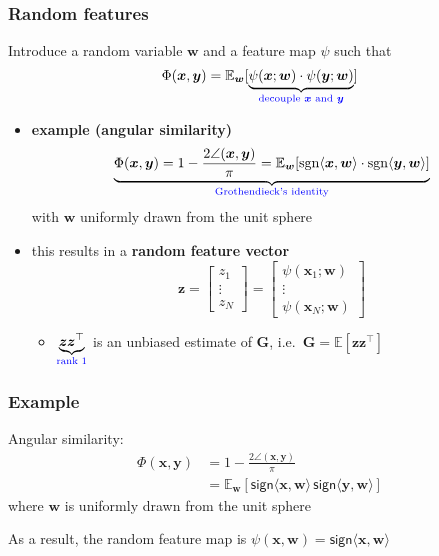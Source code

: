 \documentclass[compress,
mathserif,wide,%
]{beamer}
\begin{document}
\begin{frame}
\frametitle{Random features}  

	Introduce a random variable $\bm{w}$ and a feature map $\psi$ such that
	\[
		\Phi(\bm{x},\bm{y})=\mathbb{E}_{\bm{w}}[ \underset{\textcolor{blue}{ \text{decouple }\bm{x}\text{ and }\bm{y}}}{\underbrace{ \psi(\bm{x};\bm{w})\cdot\psi(\bm{y};\bm{w}) }} ]
	\]
	\begin{itemize}
		\item<1> {\bf example (angular similarity)}
		\begin{align}
			\label{eq:angular-similarity-random}
			\underset{\textcolor{blue}{ \text{Grothendieck's identity}}}{\underbrace{ \Phi(\bm{x},\bm{y})=1-\frac{2\angle(\bm{x},\bm{y})}{\pi}=\mathbb{E}_{\bm{w}}[\mathrm{sgn}\langle\bm{x},\bm{w}\rangle \cdot \mathrm{sgn}\langle\bm{y},\bm{w}\rangle] }}
		\end{align}
		with $\bm{w}$ uniformly drawn from the unit sphere


		\vspace{-7em}
		\item<2> this results in a {\bf random feature vector}
		\[
			\bm{z}=\left[\begin{array}{c}
				z_{1}\\
				\vdots\\
				z_{N}
			\end{array}\right]
			=\left[\begin{array}{c}
				\psi(\bm{x}_{1};\bm{w})\\
				\vdots\\
				\psi(\bm{x}_{N};\bm{w})
			\end{array}\right]
		\]
		\begin{itemize}
			\item $\underset{\textcolor{blue}{ \text{rank 1}}}{\underbrace{\bm{z}\bm{z}^{\top}}}$ is an \alert{unbiased estimate} of $\bm{G}$, i.e.~$\bm{G}=\mathbb{E}[\bm{z}\bm{z}^{\top}]$
		\end{itemize}
		
	\end{itemize}


\end{frame}


\begin{frame}
	\frametitle{Example}


	Angular similarity:
	\begin{align*}
\Phi(\bm{x},\bm{y}) & =1-\frac{2\angle(\bm{x},\bm{y})}{\pi}\\
 & =\mathbb{E}_{\bm{w}}\left[\mathsf{sign}\langle\bm{x},\bm{w}\rangle\,\mathsf{sign}\langle\bm{y},\bm{w}\rangle\right]
\end{align*}
where $\bm{w}$ is uniformly drawn from the unit sphere

\bigskip
\bigskip

	As a result, the random feature map is $\psi(\bm{x},\bm{w})=\mathsf{sign}\langle\bm{x},\bm{w}\rangle$

	
\end{frame}
\end{document}
